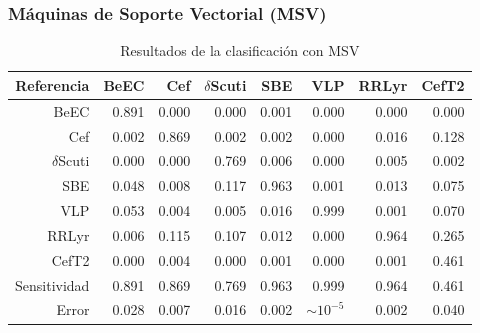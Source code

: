 \documentclass{beamer}
\begin{document}
\begin{frame}
\frametitle{Máquinas de Soporte Vectorial (MSV)}
  \begin{table}[ht]
    \centering
    \resizebox{0.7\textwidth}{!} {
      \begin{tabular}{rrrrrrrr}
        \hline
        Referencia & BeEC & Cef & $\delta$Scuti & SBE & VLP & RRLyr & CefT2 \\ 
        \hline
        BeEC & 0.891 & 0.000 & 0.000 & 0.001 & 0.000 & 0.000 & 0.000 \\ 
        Cef & 0.002 & 0.869 & 0.002 & 0.002 & 0.000 & 0.016 & 0.128 \\ 
        $\delta$Scuti & 0.000 & 0.000 & 0.769 & 0.006 & 0.000 & 0.005 & 0.002 \\ 
        SBE & 0.048 & 0.008 & 0.117 & 0.963 & 0.001 & 0.013 & 0.075 \\ 
        VLP & 0.053 & 0.004 & 0.005 & 0.016 & 0.999 & 0.001 & 0.070 \\ 
        RRLyr & 0.006 & 0.115 & 0.107 & 0.012 & 0.000 & 0.964 & 0.265 \\ 
        CefT2 & 0.000 & 0.004 & 0.000 & 0.001 & 0.000 & 0.001 & 0.461 \\
        \hline
        Sensitividad &  0.891 & 0.869 & 0.769 & 0.963 & 0.999 & 0.964 & 0.461 \\ 
        \hline
        Error & 0.028 & 0.007 & 0.016 & 0.002 & $\sim 10^{-5}$ & 0.002 & 0.040 \\ 
        \hline
      \end{tabular}
    }
    \caption{Resultados de la clasificación con MSV}
  \end{table}
\end{frame}
\end{document}
